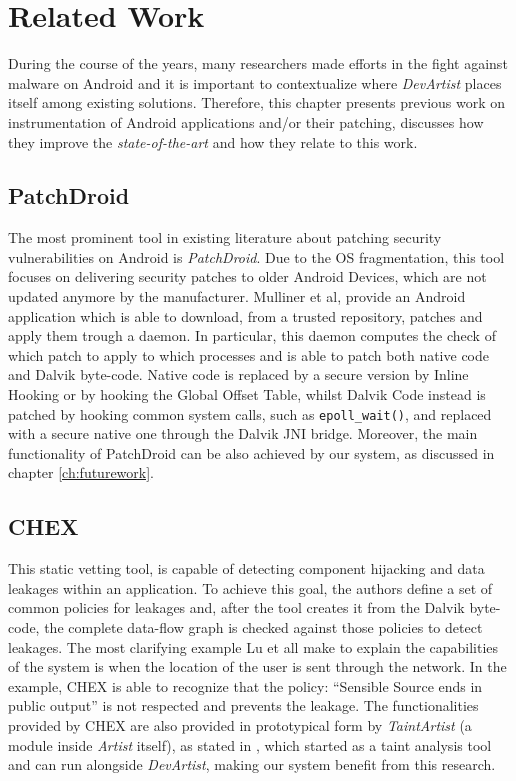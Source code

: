  \chapter{Related Work}
During the course of the years, many researchers made efforts in the fight against malware on Android and it is important to contextualize where \emph{DevArtist} places itself among existing solutions. Therefore, this chapter presents previous work on instrumentation of Android applications and/or their patching, discusses how they improve the \emph{state-of-the-art} and how they relate to this work.

\section{PatchDroid}
The most prominent tool in existing literature about patching security vulnerabilities on Android is \emph{PatchDroid}\cite{patchdroid}. Due to the OS fragmentation, this tool focuses on delivering security patches to older Android Devices, which are not updated anymore by the manufacturer. Mulliner et al, provide an Android application which is able to download, from a trusted repository, patches and apply them trough a daemon. In particular, this daemon computes the check of which patch to apply to which processes and is able to patch both native code and Dalvik byte-code.
Native code is replaced by a secure version by Inline Hooking or by hooking the Global Offset Table, whilst Dalvik Code instead is patched by hooking common system calls, such as \texttt{epoll\_wait()}, and replaced with a secure native one through the Dalvik JNI bridge. Moreover, the main functionality of PatchDroid can be also achieved by our system, as discussed in chapter \ref{ch:futurework}.

\section{CHEX}
This static vetting tool, is capable of detecting component hijacking and data leakages within an application. To achieve this goal, the authors define a set of common policies for leakages and, after the tool creates it from the Dalvik byte-code, the complete data-flow graph is checked against those policies to detect leakages. The most clarifying example Lu et all\cite{chex} make to explain the capabilities of the system is when the location of the user is sent through the network. In the example, CHEX is able to recognize that the policy: \enquote{Sensible Source ends in public output} is not respected and prevents the leakage. The functionalities provided by CHEX are also provided in prototypical form by \emph{TaintArtist} (a module inside \emph{Artist} itself), as stated in \cite{artist}, which started as a taint analysis tool and can run alongside \emph{DevArtist}, making our system benefit from this research.

